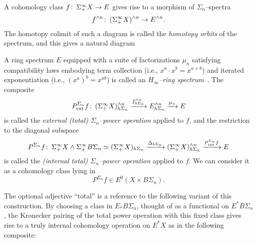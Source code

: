 \noindent A cohomology class \(f\colon\thinspace \Sigma^\infty_+ X \to E\) gives rise to a morphism of \(\Sigma_n\)--spectra \[f^{\wedge n}\colon\thinspace (\Sigma^\infty_+ X)^{\wedge n} \to E^{\wedge n}.\]  The homotopy colimit of such a diagram is called the \textit{homotopy orbits} of the spectrum, and this gives a natural diagram
\begin{center}
\end{center}
A ring spectrum \(E\) equipped with a suite of factorizations \(\mu_n\) satisfying compatibility laws embodying term collection (i.e., \(x^a \cdot x^b = x^{a+b}\)) and iterated exponentiation (i.e., \((x^a)^b = x^{ab}\)) is called an \textit{\(H_\infty\)--ring spectrum}~\cite[Definition I.3.1]{BMMS}.  The composite \[P^{\Sigma_n}_{\mathrm{ext}}f\colon\thinspace (\Sigma^\infty_+ X)^{\wedge n}_{h\Sigma_n} \xrightarrow{f^{\wedge n}_{h\Sigma_n}} E^{\wedge n}_{h\Sigma_n} \xrightarrow{\mu_n} E\] is called the \textit{external (total) \(\Sigma_n\)--power operation} applied to \(f\), and the restriction to the diagonal subspace \[P^{\Sigma_n}f \colon\thinspace \Sigma^\infty_+ X \wedge \Sigma^\infty_+ B\Sigma_n \simeq (\Sigma^\infty_+ X)_{h\Sigma_n} \xrightarrow{\Delta_{h\Sigma_n}} (\Sigma^\infty_+ X)^{\wedge n}_{h\Sigma_n} \xrightarrow{P^{\Sigma_n}_{\mathrm{ext}}f} E\] is called the \textit{(internal total) \(\Sigma_n\)--power operation} applied to \(f\).  We can consider it as a cohomology class lying in \[P^{\Sigma_n} f \in E^0(X \times B\Sigma_n).\]

\begin{remark}\label{RestrictingSteenrodOpToBasepoint}
The optional adjective ``total'' is a reference to the following variant of this construction.  By choosing a class in \(E_* B\Sigma_n\), thought of as a functional on \(E^* B\Sigma_n\), the Kronecker pairing of the total power operation with this fixed class gives rise to a truly internal cohomology operation on \(E^* X\) as in the following composite:
\begin{center}
\end{center}
\end{remark}

